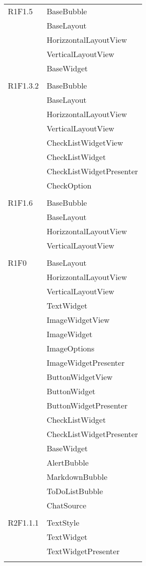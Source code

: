 \begin{center}
\begin{longtable}{|p{7cm}|p{5cm}|}
		R1F1.5 & BaseBubble \\ & BaseLayout \\ & HorizzontalLayoutView \\ & VerticalLayoutView \\ & BaseWidget \\ & \\ \hline
		R1F1.3.2 & BaseBubble \\ & BaseLayout \\ & HorizzontalLayoutView \\ & VerticalLayoutView \\ & CheckListWidgetView \\ & CheckListWidget \\ & CheckListWidgetPresenter \\ & CheckOption \\ & \\ \hline
		R1F1.6 & BaseBubble \\ & BaseLayout \\ & HorizzontalLayoutView \\ & VerticalLayoutView \\ & \\ \hline
		R1F0 & BaseLayout \\ & HorizzontalLayoutView \\ & VerticalLayoutView \\ & TextWidget \\ & ImageWidgetView \\ & ImageWidget \\ & ImageOptions \\ & ImageWidgetPresenter \\ & ButtonWidgetView \\ & ButtonWidget \\ & ButtonWidgetPresenter \\ & CheckListWidget \\ & CheckListWidgetPresenter \\ & BaseWidget \\ & AlertBubble \\ & MarkdownBubble \\ & ToDoListBubble \\ & ChatSource \\ & \\ \hline
		R2F1.1.1 & TextStyle \\ & TextWidget \\ & TextWidgetPresenter \\ & \\ \hline

\end{longtable}
\end{center}
